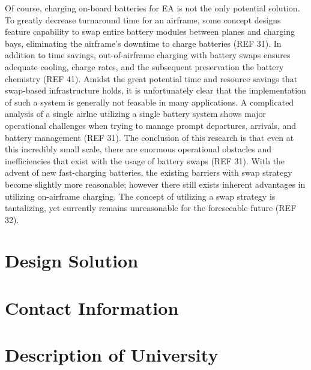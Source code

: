 \documentclass{article}
\begin{document}
Of course, charging on-board batteries for EA is not the only potential solution. To greatly decrease turnaround time for an airframe, some concept designs feature capability to swap entire battery modules between planes and charging bays, eliminating the airframe’s downtime to charge batteries (REF 31). In addition to time savings, out-of-airframe charging with battery swaps ensures adequate cooling, charge rates, and the subsequent preservation the battery chemistry (REF 41). Amidst the great potential time and resource savings that swap-based infrastructure holds, it is unfortunately clear that the implementation of such a system is generally not feasable in many applications. A complicated analysis of a single airlne utilizing a single battery system shows major operational challenges when trying to manage prompt departures, arrivals, and battery management (REF 31). The conclusion of this research is that even at this incredibly small scale, there are enormous operational obstacles and inefficiencies that exist with the usage of battery swaps (REF 31). With the advent of new fast-charging batteries, the existing barriers with swap strategy become slightly more reasonable; however there still exists inherent advantages in utilizing on-airframe charging.  The concept of utilizing a swap strategy is tantalizing, yet currently remains unreasonable for the foreseeable future (REF 32).\par

\newpage
\section{Design Solution}\label{solution}

\blindtext 

\newpage
\appendixpage
\appendix
\section{Contact Information}\label{apxA}
\blindtext

\section{Description of University}\label{apxB}
\blindtext

\newpage
\end{document}

